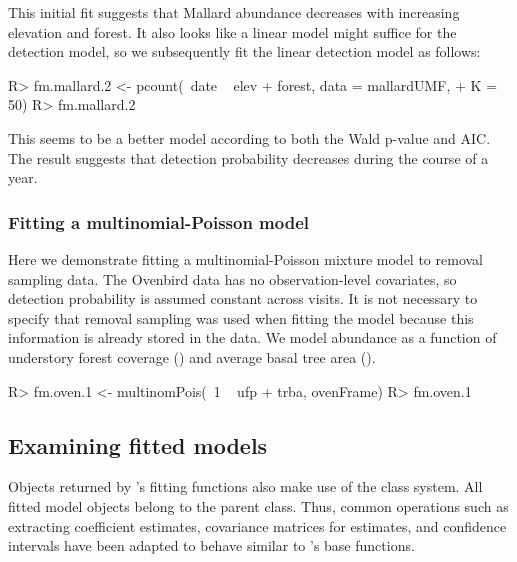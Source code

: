 \documentclass[article,shortnames]{jss}
\newcommand{\um}{\pkg{unmarked}}
\newcommand{\rlang}{\proglang{R}}
\begin{document}
{This initial fit suggests that Mallard abundance decreases with
increasing elevation and forest.  It also looks like a linear model
might suffice for the detection model, so we subsequently fit the
linear detection model as follows:


\begin{Schunk}
\begin{Sinput}
R> fm.mallard.2 <- pcount(~date ~ elev + forest, data = mallardUMF, 
+     K = 50)
R> fm.mallard.2
\end{Sinput}
\end{Schunk}

This seems to be a better model according to both the Wald p-value and
AIC.  The result suggests that detection probability decreases during the
course of a year.



\subsubsection{Fitting a multinomial-Poisson model}

Here we demonstrate fitting a multinomial-Poisson mixture model to removal
sampling data.  The Ovenbird data has no observation-level covariates, so
detection probability is assumed constant across visits.  It is not necessary
to specify that removal sampling was used when fitting the model
because this information is already stored in the  data.
We model abundance as a function of understory forest coverage ()
and average basal tree area ().

\begin{Schunk}
\begin{Sinput}
R> fm.oven.1 <- multinomPois(~1 ~ ufp + trba, ovenFrame)
R> fm.oven.1
\end{Sinput}
\end{Schunk}


\subsection{Examining fitted models}
\label{sec:examining-model-fits}

Objects returned by \um's fitting functions also make use of the 
class system.  All fitted model objects belong to the 
parent class.  Thus, common operations such as extracting coefficient
estimates, covariance matrices for estimates, and confidence intervals
have been adapted to behave similar to \rlang's base functions.

}
\end{document}

